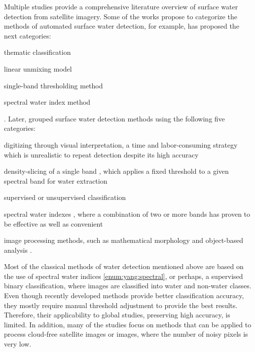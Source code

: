Multiple studies provide a comprehensive literature overview of surface water detection from satellite imagery. Some of the works propose to categorize the methods of automated surface water detection, for example, \citet{Ji2009} has proposed the next categories:
\begin{enumerate*}[label=(\emph{\alph*})]
	\item \label {enum:ji:thematic} thematic classification \citet{lira2006segmentation}
	\item \label {enum:ji:unmixing} linear unmixing model \citet{sethre2005remote}
	\item \label {enum:ji:th} single-band thresholding method \citet{jain2005delineation}
	\item \label {enum:ji:specral} spectral water index method \citet{McFeeters1996, Xu2006, feyisa2014automated, hoberg2015conditional, fisher2016comparing}
\end{enumerate*}. Later, \citet{yang2015landsat} grouped surface water detection methods using the following five categories: 
\begin{enumerate*}[label=(\emph{\alph*})]
	\item \label {enum:yang:manual} digitizing through visual interpretation, a time and labor-consuming strategy which is unrealistic to repeat detection despite its high accuracy
	\item \label {enum:yang:single} density-slicing of a single band \citet{frazier2000water, ryu2002waterline, white1999monitoring}, which applies a fixed threshold to a given spectral band for water extraction
	\item \label {enum:yang:ml} supervised or unsupervised classification
	\item \label {enum:yang:spectral} spectral water indexes \citet{McFeeters1996, Xu2006, hoberg2015conditional, fisher2016comparing}, where a combination of two or more bands has proven to be effective as well as convenient
	\item \label {enum:yang:im} image processing methods, such as mathematical morphology and object-based analysis \citet{blaschke2010object, lira2006segmentation, yang2015landsat}.
\end{enumerate*} 

Most of the classical methods of water detection mentioned above are based on the use of spectral water indices \ref{enum:yang:spectral}, or perhaps, a supervised binary classification, where images are classified into water and non-water classes. Even though recently developed methods provide better classification accuracy, they mostly require manual threshold adjustment to provide the best results. Therefore, their applicability to global studies, preserving high accuracy, is limited. In addition, many of the studies focus on methods that can be applied to process cloud-free satellite images or images, where the number of noisy pixels is very low.

